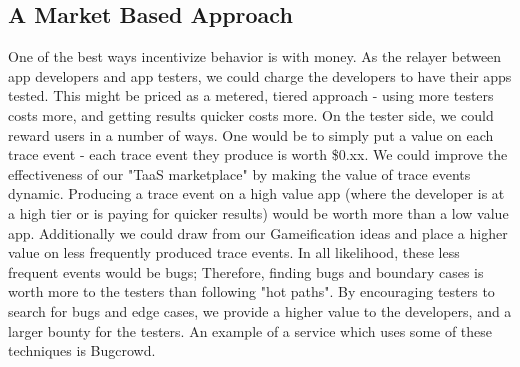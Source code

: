 \subsection{A Market Based Approach}
One of the best ways incentivize behavior is with money. As the relayer between app developers
and app testers, we could charge the developers to have their apps tested. This might be priced
as a metered, tiered approach - using more testers costs more, and getting results quicker costs more.
On the tester side, we could reward users in a number of ways. One would be to simply put a
value on each trace event - each trace event they produce is worth \$0.xx. We could improve the
effectiveness of our "TaaS marketplace" by making the value of trace events dynamic. Producing a trace
event on a high value app (where the developer is at a high tier or is paying for quicker results) would
be worth more than a low value app. Additionally we could draw from our Gameification
ideas and place a higher value on less frequently produced trace events. In all likelihood, these
less frequent events would be bugs; Therefore, finding bugs and boundary cases is worth more to the 
testers than following "hot paths". By encouraging testers to search for bugs and edge cases, we
provide a higher value to the developers, and a larger bounty for the testers.
An example of a service which uses some of these techniques is Bugcrowd\cite{Bugcrowd}.

